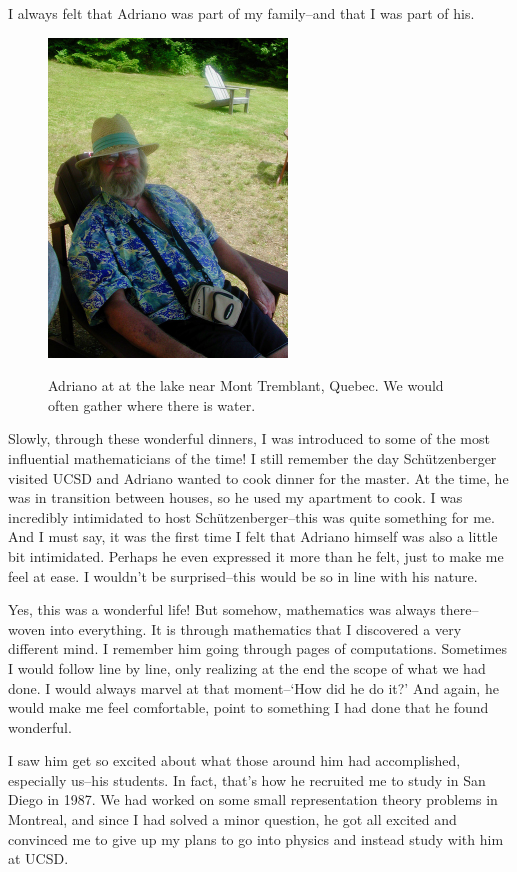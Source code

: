 \documentclass{notices}
\begin{document}
I always felt that Adriano was part of my family--and that I was part of his. 

\begin{figure}[h]
\begin{center}
\includegraphics[width=2.5in]{Nantel_Bergeron/DSCN3064.jpeg}
\end{center}
{\footnotesize Adriano at at the lake near Mont Tremblant, Quebec. We would often gather where there is water.}
\end{figure}

Slowly, through these wonderful dinners, I was introduced to some of the most influential mathematicians of the time! I still remember the day Schützenberger visited UCSD and Adriano wanted to cook dinner for the master. At the time, he was in transition between houses, so he used my apartment to cook. I was incredibly intimidated to host Schützenberger--this was quite something for me. And I must say, it was the first time I felt that Adriano himself was also a little bit intimidated. Perhaps he even expressed it more than he felt, just to make me feel at ease. I wouldn't be surprised--this would be so in line with his nature.

Yes, this was a wonderful life! But somehow, mathematics was always there--woven into everything. It is through mathematics that I discovered a very different mind. I remember him going through pages of computations. Sometimes I would follow line by line, only realizing at the end the scope of what we had done. I would always marvel at that moment--`How did he do it?' And again, he would make me feel comfortable, point to something I had done that he found wonderful.

I saw him get so excited about what those around him had accomplished, especially us--his students. In fact, that's how he recruited me to study in San Diego in 1987. We had worked on some small representation theory problems in Montreal, and since I had solved a minor question, he got all excited and convinced me to give up my plans to go into physics and instead study with him at UCSD.
\end{document}
